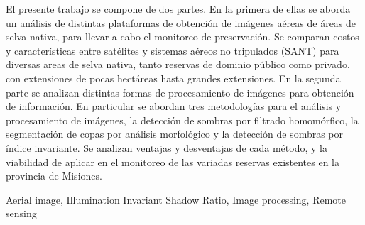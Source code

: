 El presente trabajo se compone de dos partes. En la primera de ellas se aborda un análisis de distintas plataformas de obtención de imágenes aéreas de áreas de selva nativa, para llevar a cabo el monitoreo de preservación. Se comparan costos y características entre satélites y sistemas aéreos no tripulados (SANT) para diversas areas de selva nativa, tanto reservas de dominio público como privado, con extensiones de pocas hectáreas hasta grandes extensiones. En la segunda parte se analizan distintas formas de procesamiento de imágenes para obtención de información. En particular se abordan tres metodologías para el análisis y procesamiento de imágenes, la detección de sombras por filtrado homomórfico, la segmentación de copas por análisis morfológico y la detección de sombras por índice invariante. Se analizan ventajas y desventajas de cada método, y la viabilidad de aplicar en el monitoreo de las variadas reservas existentes en la provincia de Misiones.\\
\begin{keywords}
    Aerial image, Illumination Invariant Shadow Ratio, Image processing, Remote sensing
\end{keywords}    %

